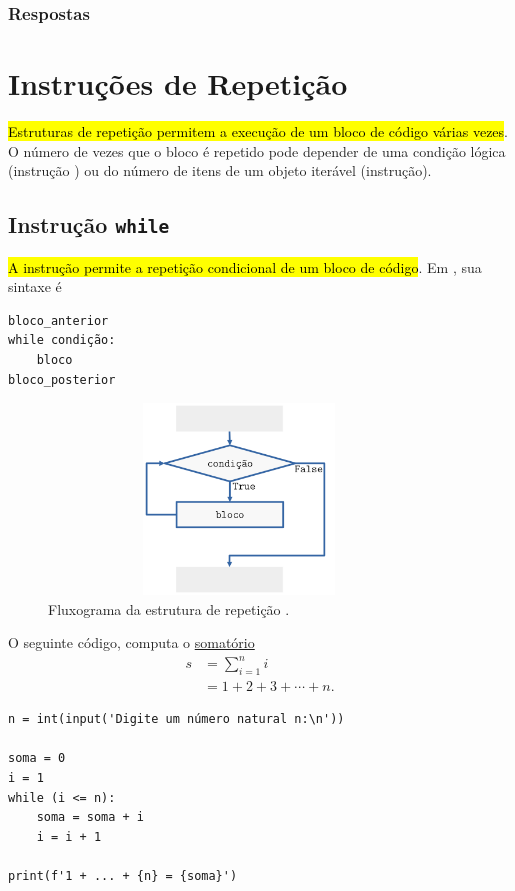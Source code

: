 \ifisbook
\newpage
\subsubsection{Respostas}
\shipoutAnswer
\fi


\section{Instruções de Repetição}\label{cap_progest_sec_repete}

\hl{Estruturas de repetição permitem a execução de um bloco de código várias vezes}. O número de vezes que o bloco é repetido pode depender de uma condição lógica (instrução {\PYTHONwhile}) ou do número de itens de um objeto iterável (instrução{\PYTHONfor}).

\subsection{Instrução \texttt{while}}

\hl{A instrução {\PYTHONwhile} permite a repetição condicional de um bloco de código}. Em {\python}, sua sintaxe é

\begin{lstlisting}
bloco_anterior
while condição:
    bloco
bloco_posterior
\end{lstlisting}

\begin{figure}[H]
  \centering
  \includegraphics[max width=0.9\textwidth, height=2in]{./cap_progest/dados/fig_fg_while/fig.png}
  \caption{Fluxograma da estrutura de repetição {\PYTHONwhile}.}
  \label{fig:cap_progest_sec_repete:fig:fg_while}
\end{figure}

\begin{ex}\label{cap_progest_ec_repete:ex:while_soma_num}
  O seguinte código, computa o \href{https://pt.wikipedia.org/wiki/Somat%C3%B3rio}{somatório}
  \begin{align}
    s &= \sum_{i=1}^{n}i\\
      &= 1 + 2 + 3 + \cdots + n.
  \end{align}

\begin{lstlisting}
n = int(input('Digite um número natural n:\n'))

soma = 0
i = 1
while (i <= n):
    soma = soma + i
    i = i + 1

print(f'1 + ... + {n} = {soma}')
\end{lstlisting}

\end{ex}

